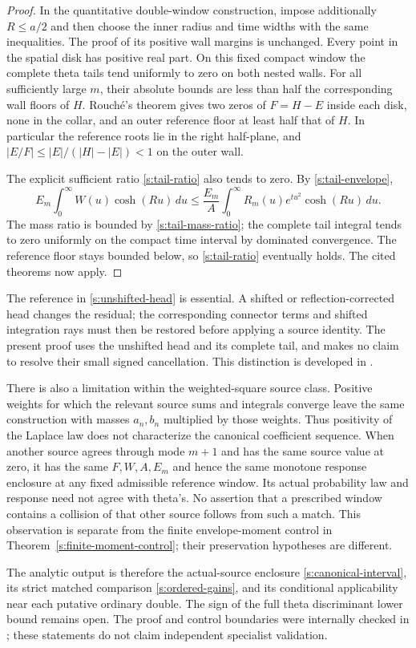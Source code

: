 \begin{proof}
In the quantitative double-window construction, impose additionally
$R\le a/2$ and then choose the inner radius and time widths with the
same inequalities.  The proof of its positive wall margins is
unchanged.  Every point in the spatial disk has positive real part.
On this fixed compact window the complete theta tails tend uniformly
to zero on both nested walls.  For all sufficiently large $m$, their
absolute bounds are less than half the corresponding wall floors of
$H$.  Rouch\'e's theorem gives two zeros of $F=H-E$ inside each disk,
none in the collar, and an outer reference floor at least half that of
$H$.  In particular the reference roots lie in the right half-plane,
and $|E/F|\le|E|/(|H|-|E|)<1$ on the outer wall.

The explicit sufficient ratio \eqref{s:tail-ratio} also tends to zero.
By \eqref{s:tail-envelope},
\[
 E_m\int_0^\infty W(u)\cosh(Ru)\,du
 \le\frac{E_m}{A}
       \int_0^\infty R_m(u)e^{tu^2}\cosh(Ru)\,du.
\]
The mass ratio is bounded by \eqref{s:tail-mass-ratio}; the complete
tail integral tends to zero uniformly on the compact time interval by
dominated convergence.  The reference floor stays bounded below, so
\eqref{s:tail-ratio} eventually holds.  The cited theorems now apply.
\end{proof}

The reference in \eqref{s:unshifted-head} is essential.  A shifted or
reflection-corrected head changes the residual; the corresponding
connector terms and shifted integration rays must then be restored
before applying a source identity.  The present proof uses the
unshifted head and its complete tail, and makes no claim to resolve
their small signed cancellation.  This distinction is developed in
\cite{tail05}.

There is also a limitation within the weighted-square source class.
Positive weights for which the relevant source sums and integrals
converge leave the same construction with masses $a_n,b_n$ multiplied
by those weights.  Thus positivity of the Laplace
law does not characterize the canonical coefficient sequence.  When
another source agrees through mode $m+1$ and has the same source value
at zero, it has the same $F,W,A,E_m$ and hence the same monotone
response enclosure at any fixed admissible reference window.  Its
actual probability law and response need not agree with theta's.
No assertion that a prescribed window contains a collision of that
other source follows from such a match.  This observation is separate
from the finite envelope-moment control in
Theorem~\ref{s:finite-moment-control}; their preservation hypotheses
are different.

The analytic output is therefore the actual-source enclosure
\eqref{s:canonical-interval}, its strict matched comparison
\eqref{s:ordered-gains}, and its conditional applicability near each
putative ordinary double.  The sign of the full theta discriminant
lower bound remains open.  The proof and control boundaries were
internally checked in \cite{review08}; these statements do not claim
independent specialist validation.
